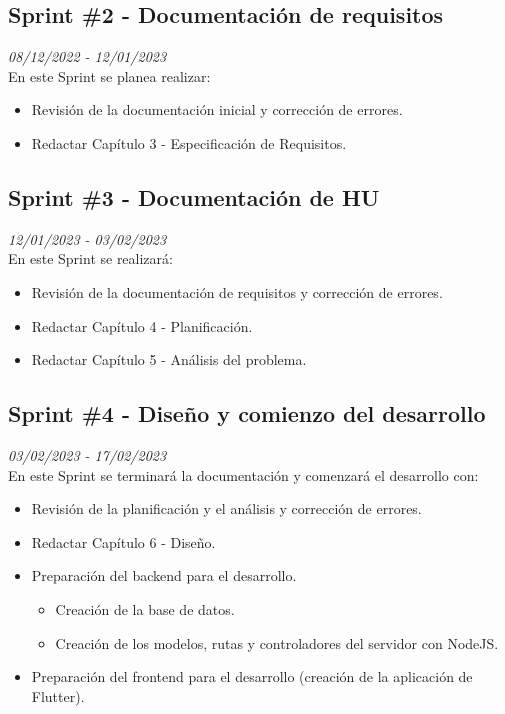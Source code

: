 \subsection{Sprint \#2 - Documentación de requisitos}
\textit{08/12/2022   -   12/01/2023}\\

En este Sprint se planea realizar:
\begin{itemize}
    \item Revisión de la documentación inicial y corrección de errores.
    \item Redactar Capítulo 3 - Especificación de Requisitos.
\end{itemize}

\newpage

\subsection{Sprint \#3 - Documentación de HU}
\textit{12/01/2023   -   03/02/2023}\\

En este Sprint se realizará:
\begin{itemize}
    \item Revisión de la documentación de requisitos y corrección de errores.
    \item Redactar Capítulo 4 - Planificación.
    \item Redactar Capítulo 5 - Análisis del problema.
\end{itemize}
\subsection{Sprint \#4 - Diseño y comienzo del desarrollo}
\textit{03/02/2023   -   17/02/2023}\\

En este Sprint se terminará la documentación y comenzará el desarrollo con:
\begin{itemize}
    \item Revisión de la planificación y el análisis y corrección de errores.
    \item Redactar Capítulo 6 - Diseño.
    \item Preparación del backend para el desarrollo.
          \begin{itemize}
              \item Creación de la base de datos.
              \item Creación de los modelos, rutas y controladores del servidor con NodeJS.
          \end{itemize}
    \item Preparación del frontend para el desarrollo (creación de la aplicación de Flutter).
\end{itemize}

